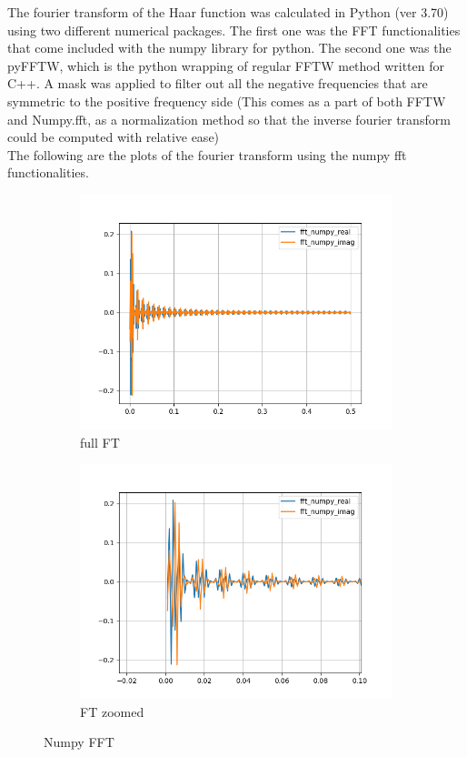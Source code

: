 \documentclass[12pt]{article}
\begin{document}
The fourier transform of the Haar function was calculated in Python (ver 3.70) using two different numerical packages. The first one was the FFT functionalities that come included with the numpy library for python. The second one was the pyFFTW, which is the python wrapping of regular FFTW method written for C++. A mask was applied to filter out all the negative frequencies that are symmetric to the positive frequency side (This comes  as a part of both FFTW and Numpy.fft, as a normalization method so that the inverse fourier transform could be computed with relative ease) \\ 
The following are the plots of the fourier transform using the numpy fft functionalities.
\begin{figure}[h]
	\centering
	\begin{subfigure}[h]{0.40\textwidth}
		\centering
			\includegraphics[width=\textwidth]{freq_domain_numpy_full.png}
		\caption{full FT}
	\end{subfigure}
	\begin{subfigure}[h]{0.40\textwidth}
		\centering
			\includegraphics[width=\textwidth]{freq_domain_numpy_nonshift.png}
		\caption{FT zoomed}
	\end{subfigure}
	\caption{Numpy FFT}
\end{figure}
\end{document}
